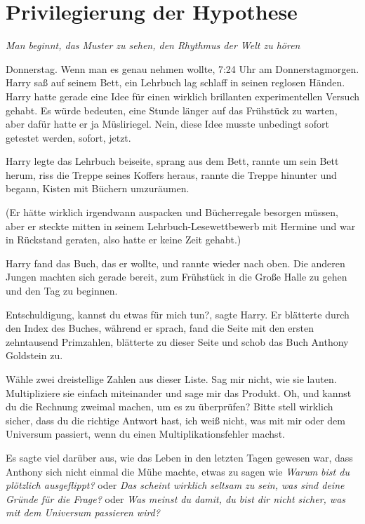 \chapter{Privilegierung der Hypothese}

\emph{Man beginnt, das Muster zu sehen, den Rhythmus der Welt zu hören}

Donnerstag. Wenn man es genau nehmen wollte, 7:24 Uhr am
Donnerstagmorgen. Harry saß auf seinem Bett, ein Lehrbuch lag schlaff in seinen
reglosen Händen. Harry hatte gerade eine Idee für einen wirklich brillanten
experimentellen Versuch gehabt. Es würde bedeuten, eine Stunde länger auf das
Frühstück zu warten, aber dafür hatte er ja Müsliriegel. Nein, diese Idee musste
unbedingt sofort getestet werden, sofort, jetzt.

Harry legte das Lehrbuch beiseite, sprang aus dem Bett, rannte um sein Bett
herum, riss die Treppe seines Koffers heraus, rannte die Treppe hinunter und
begann, Kisten mit Büchern umzuräumen.

(Er hätte wirklich irgendwann auspacken und Bücherregale besorgen müssen, aber
er steckte mitten in seinem Lehrbuch-Lesewettbewerb mit Hermine und war in
Rückstand geraten, also hatte er keine Zeit gehabt.)

Harry fand das Buch, das er wollte, und rannte wieder nach oben. Die anderen
Jungen machten sich gerade bereit, zum Frühstück in die Große Halle zu gehen und
den Tag zu beginnen.

\glqq{}Entschuldigung, kannst du etwas für mich tun?\grqq{}, sagte Harry. Er
blätterte durch den Index des Buches, während er sprach, fand die Seite mit den
ersten zehntausend Primzahlen, blätterte zu dieser Seite und schob das Buch
Anthony Goldstein zu.

\glqq{}Wähle zwei dreistellige Zahlen aus dieser Liste. Sag mir nicht, wie sie
lauten. Multipliziere sie einfach miteinander und sage mir das Produkt. Oh, und
kannst du die Rechnung zweimal machen, um es zu überprüfen? Bitte stell wirklich
sicher, dass du die richtige Antwort hast, ich weiß nicht, was mit mir oder dem
Universum passiert, wenn du einen Multiplikationsfehler machst.\grqq{}

Es sagte viel darüber aus, wie das Leben in den letzten Tagen gewesen war, dass
Anthony sich nicht einmal die Mühe machte, etwas zu sagen wie \glqq{}\emph{Warum
bist du plötzlich ausgeflippt?\grqq{}} oder \glqq{}\emph{Das scheint wirklich
seltsam zu sein, was sind deine Gründe für die Frage?}\grqq{} oder \glqq{}
\emph{Was meinst du damit, du bist dir nicht sicher, was mit dem Universum
passieren wird?\grqq{}}

